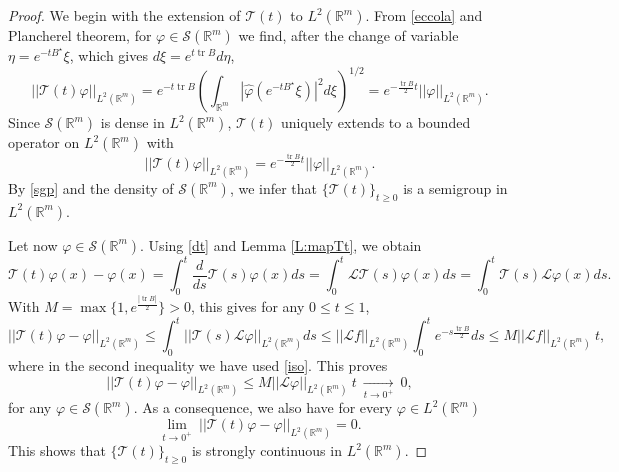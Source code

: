 \documentclass[11pt,a4paper]{amsart}
\def \vf{\varphi}
\def \So {\mathscr{S}(\Rm)}
\newcommand{\Rm}{\mathbb R^m}
\numberwithin{equation}{section}
\newcommand{\tr}{\operatorname{tr}}
\numberwithin{equation}{section}
\begin{document}
\begin{proof}



We begin with the extension of $\mathcal T(t)$ to  $L^2(\Rm)$.  From \eqref{eccola} and Plancherel theorem, for $\vf\in \So$ we  find, after the change of variable $\eta = e^{-tB^\star}\xi$, which gives $d\xi = e^{t \tr B} d\eta$, 
\begin{equation}\label{finale}
||\mathcal T(t) \vf||_{L^2(\Rm)} = e^{-t \tr B} \left(\int_{\Rm} |\hat \vf(e^{-tB^\star}\xi)|^2 d\xi\right)^{1/2} = e^{-\frac{\tr B}2 t } ||\vf||_{L^2(\Rm)}.
\end{equation}
Since $\So$ is dense in $L^2(\Rm)$, $\mathcal T(t)$ uniquely extends to a bounded operator on $L^2(\Rm)$ with
\begin{equation}\label{iso}
||\mathcal T(t) \vf||_{L^2(\Rm)} = e^{-\frac{\tr B}2 t } ||\vf||_{L^2(\Rm)}.
\end{equation}
By \eqref{sgp} and the density of $\So$, we infer that $\{\mathcal T(t)\}_{t\ge 0}$ is a semigroup in $L^2(\Rm)$.

Let now $\vf\in \So$. Using \eqref{dt} and Lemma \ref{L:mapTt}, we obtain  
\begin{equation}\label{diffT}
\mathcal T(t) \vf(x) - \vf(x)  = \int_0^t \frac{d}{ds} \mathcal T(s) \vf(x) ds = \int_0^t \mathscr L \mathcal T(s) \vf(x) ds = \int_0^t \mathcal T(s)  \mathscr L \vf(x) ds.
\end{equation}
With $M = \max\{1,e^{\frac{|\tr B|}2}\}>0$, this gives for any $0\le t \le 1$,
\[
||\mathcal T(t) \vf - \vf||_{L^2(\Rm)} \le \int_0^t ||\mathcal T(s)  \mathscr L \vf||_{L^2(\Rm)} ds \le ||\mathscr L f||_{L^2(\Rm)} \int_0^t  e^{- s \frac{\operatorname{tr} B}2} ds \le M ||\mathscr L f||_{L^2(\Rm)}\ t,
\]
where in the second inequality we have used \eqref{iso}.
This proves 
\begin{equation}\label{sc1}
||\mathcal T(t) \vf- \vf||_{L^2(\Rm)} \le M ||\mathscr L \vf||_{L^2(\Rm)}\ t\ \underset{t \to 0^+}{\longrightarrow}\ 0,
\end{equation}
for any $\vf\in \So$. As a consequence, we also have for every $\vf\in L^2(\Rm)$ 
\begin{equation}\label{sc3}
\underset{t\to 0^+}{\lim}\ ||\mathcal T(t) \vf - \vf||_{L^2(\Rm)} = 0.
\end{equation}
This shows that $\{\mathcal T(t)\}_{t\ge 0}$ is strongly continuous in $L^2(\Rm)$. 


\end{proof}
\end{document}
